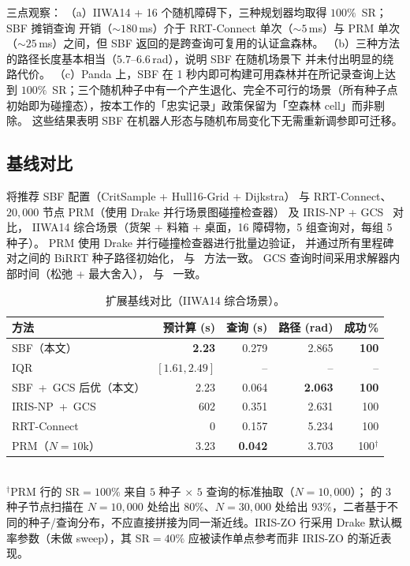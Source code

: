 \documentclass[journal]{IEEEtran}
\begin{document}


三点观察：
（a）IIWA14 + 16 个随机障碍下，三种规划器均取得 $100\%$~SR；SBF 摊销查询
开销（${\sim}180$\,ms）介于 RRT-Connect 单次（${\sim}5$\,ms）与 PRM 单次
（${\sim}25$\,ms）之间，但 SBF 返回的是跨查询可复用的认证盒森林。
（b）三种方法的路径长度基本相当（$5.7$--$6.6$\,rad），说明 SBF 在随机场景下
并未付出明显的绕路代价。
（c）Panda 上，SBF 在 1 秒内即可构建可用森林并在所记录查询上达到
$100\%$~SR；三个随机种子中有一个产生退化、完全不可行的场景（所有种子点
初始即为碰撞态），按本工作的「忠实记录」政策保留为「空森林 cell」而非剔除。
这些结果表明 SBF 在机器人形态与随机布局变化下无需重新调参即可迁移。

\subsection{基线对比}\label{sec:exp_baselines}

将推荐 SBF 配置（CritSample + Hull16-Grid + Dijkstra）
与 RRT-Connect、$20{,}000$ 节点 PRM（使用 Drake 并行场景图碰撞检查器）
及 IRIS-NP + GCS~\cite{marcucci2024motion} 对比，
IIWA14 综合场景（货架 + 料箱 + 桌面，16 障碍物，5 组查询对，每组 5 种子）。
PRM 使用 Drake 并行碰撞检查器进行批量边验证，
并通过所有里程碑对之间的 BiRRT 种子路径初始化，
与~\cite{marcucci2024motion} 方法一致。
GCS 查询时间采用求解器内部时间（松弛 + 最大舍入），
与~\cite{marcucci2024motion} 一致。

\begin{table}[t]
\centering
\caption{扩展基线对比（IIWA14 综合场景）。}
\label{tab:baselines_v2}
\small
\begin{tabular}{@{}lrrrr@{}}
\toprule
\textbf{方法} & \textbf{预计算 (s)} & \textbf{查询 (s)}
  & \textbf{路径 (rad)} & \textbf{成功\,\%} \\
\midrule
SBF（本文）             & \textbf{2.23} & 0.279 & 2.865 & \textbf{100} \\
\quad IQR               & $[1.61,2.49]$ & --    & --    & --  \\
SBF~+~GCS 后优（本文） & 2.23          & 0.064 & \textbf{2.063} & \textbf{100} \\
\midrule
IRIS-NP~+~GCS           & 602           & 0.351 & 2.631  & 100 \\
RRT-Connect             & 0             & 0.157 & 5.234 & 100 \\
PRM（$N{=}10\mathrm{k}$） & 3.23          & \textbf{0.042} & 3.703 & 100$^{\dagger}$ \\
\bottomrule
\end{tabular}
\\[2pt]
{\footnotesize $^{\dagger}$PRM 行的 SR$=100\%$ 来自 $5$ 种子 $\times$ $5$ 查询的标准抽取（$N{=}10{,}000$）； 的 3 种子节点扫描在 $N{=}10{,}000$ 处给出 $80\%$、$N{=}30{,}000$ 处给出 $93\%$，二者基于不同的种子/查询分布，不应直接拼接为同一渐近线。IRIS-ZO 行采用 Drake 默认概率参数（未做 sweep），其 SR$=40\%$ 应被读作单点参考而非 IRIS-ZO 的渐近表现。}
\end{table}
\end{document}
